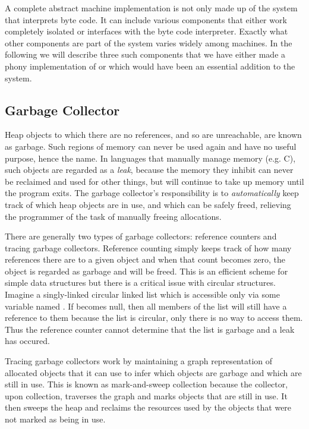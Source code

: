A complete abstract machine implementation is not only made up of the system
that interprets byte code. It can include various components that either work
completely isolated or interfaces with the byte code interpreter. Exactly what
other components are part of the system varies widely among machines. In the
following we will describe three such components that we have either made a
phony implementation of or which would have been an essential addition to the
system.

\subsection{Garbage Collector}
\label{sec:separate-components:gc}

Heap objects to which there are no references, and so are unreachable, are known
as garbage. Such regions of memory can never be used again and have no useful
purpose, hence the name. In languages that manually manage memory (e.g. C), such
objects are regarded as a \textit{leak}, because the memory they inhibit can
never be reclaimed and used for other things, but will continue to take up
memory until the program exits. The garbage collector's responsibility is to
\textit{automatically} keep track of which heap objects are in use, and which
can be safely freed, relieving the programmer of the task of manually freeing
allocations.

There are generally two types of garbage collectors: reference counters and
tracing garbage collectors. Reference counting simply keeps track of how many
references there are to a given object and when that count becomes zero, the
object is regarded as garbage and will be freed. This is an efficient scheme for
simple data structures but there is a critical issue with circular
structures\cite{bruno}. Imagine a singly-linked circular linked list which is
accessible only via some variable named . If  becomes
null, then all members of the list will still have a reference to them because
the list is circular, only there is no way to access them. Thus the reference
counter cannot determine that the list is garbage and a leak has occured.

Tracing garbage collectors work by maintaining a graph representation of
allocated objects that it can use to infer which objects are garbage and which
are still in use. This is known as mark-and-sweep collection because the
collector, upon collection, traverses the graph and marks objects that are still
in use. It then sweeps the heap and reclaims the resources used by the objects
that were not marked as being in use.

